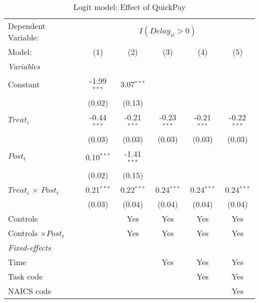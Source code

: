 \documentclass[
]{article}
\begin{document}
\begin{table}[htbp]
   \caption{Logit model: Effect of QuickPay}
   \centering
   \begin{tabular}{lccccc}
      \tabularnewline \midrule \midrule
      Dependent Variable: & \multicolumn{5}{c}{$I(Delay_{it}>0)$}\\
      Model:                       & (1)           & (2)           & (3)           & (4)           & (5)\\  
      \midrule
      \emph{Variables}\\
      Constant                     & -1.99$^{***}$ & 3.07$^{***}$  &               &               &   \\   
                                   & (0.02)        & (0.13)        &               &               &   \\   
      $Treat_i$                    & -0.44$^{***}$ & -0.21$^{***}$ & -0.23$^{***}$ & -0.21$^{***}$ & -0.22$^{***}$\\   
                                   & (0.03)        & (0.03)        & (0.03)        & (0.03)        & (0.03)\\   
      $Post_t$                     & 0.10$^{***}$  & -1.41$^{***}$ &               &               &   \\   
                                   & (0.02)        & (0.15)        &               &               &   \\   
      $Treat_i$ $\times$ $Post_t$  & 0.21$^{***}$  & 0.22$^{***}$  & 0.24$^{***}$  & 0.24$^{***}$  & 0.24$^{***}$\\   
                                   & (0.03)        & (0.04)        & (0.04)        & (0.04)        & (0.04)\\   
      Controls                     &               & Yes           & Yes           & Yes           & Yes\\  
      Controls $\times Post_t$     &               & Yes           & Yes           & Yes           & Yes\\  
      \midrule
      \emph{Fixed-effects}\\
      Time                         &               &               & Yes           & Yes           & Yes\\  
      Task code                    &               &               &               & Yes           & Yes\\  
      NAICS code                   &               &               &               &               & Yes\\  

\end{tabular}
\end{table}
\end{document}
